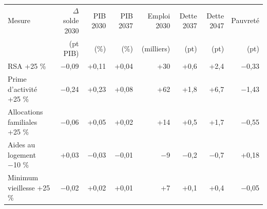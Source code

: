 \begin{tabular}{p{5.2cm}rrrrrrr}
\toprule
Mesure & $\Delta$solde 2030 & PIB 2030 & PIB 2037 & Emploi 2030 & Dette 2037 & Dette 2047 & Pauvreté \\
 & (pt PIB) & (\%) & (\%) & (milliers) & (pt) & (pt) & (pt) \\
\midrule
RSA +25 \% & $-$0{,}09 & +0{,}11 & +0{,}04 & +30 & +0{,}6 & +2{,}4 & $-$0{,}33 \\
Prime d'activité +25 \% & $-$0{,}24 & +0{,}23 & +0{,}08 & +62 & +1{,}8 & +6{,}7 & $-$1{,}43 \\
Allocations familiales +25 \% & $-$0{,}06 & +0{,}05 & +0{,}02 & +14 & +0{,}5 & +1{,}7 & $-$0{,}55 \\
Aides au logement −10 \% & +0{,}03 & $-$0{,}03 & $-$0{,}01 & $-$9 & $-$0{,}2 & $-$0{,}7 & +0{,}18 \\
Minimum vieillesse +25 \% & $-$0{,}02 & +0{,}02 & +0{,}01 & +7 & +0{,}1 & +0{,}4 & $-$0{,}05 \\
\bottomrule
\end{tabular}
